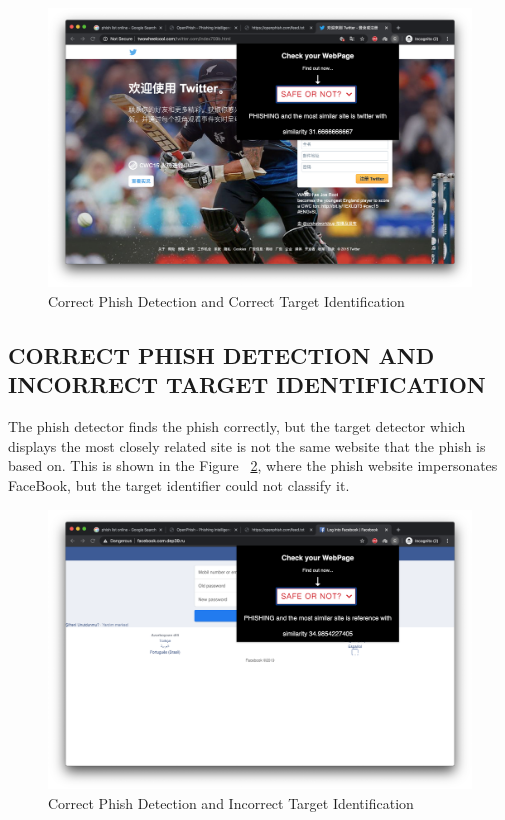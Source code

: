 \begin{figure}[htp]
\centering
\includegraphics[scale=0.2]{Figures/image17.png}
\caption{Correct Phish Detection and Correct Target Identification}
\label{fig:cc}
\end{figure}

\subsection{CORRECT PHISH DETECTION AND INCORRECT TARGET IDENTIFICATION}
The phish detector finds the phish correctly, but the target detector which displays the most closely related site is not the same website that the phish is based on. This is shown in the Figure ~\ref{fig:ci}, where the phish website impersonates FaceBook, but the target identifier could not classify it.

\begin{figure}[htp]
\centering
\includegraphics[scale=0.2]{Figures/image18.png}
\caption{Correct Phish Detection and Incorrect Target Identification}
\label{fig:ci}
\end{figure}

